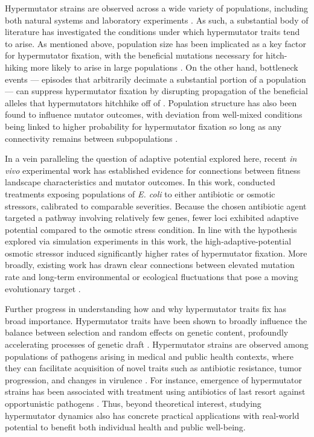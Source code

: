 Hypermutator strains are observed across a wide variety of populations, including both natural systems and laboratory experiments \citep{sniegowski1997evolution,swings2017adaptive,maddamsetti2020divergent,cherry2018methylation}.
As such, a substantial body of literature has investigated the conditions under which hypermutator traits tend to arise.
As mentioned above, population size has been implicated as a key factor for hypermutator fixation, with the beneficial mutations necessary for hitch-hiking more likely to arise in large populations \citep{raynes2018sign}.
On the other hand, bottleneck events --- episodes that arbitrarily decimate a substantial portion of a population --- can suppress hypermutator fixation by disrupting propagation of the beneficial alleles that hypermutators hitchhike off of \citep{raynes2013effect}.
Population structure has also been found to influence mutator outcomes, with deviation from well-mixed conditions being linked to higher probability for hypermutator fixation so long as any connectivity remains between subpopulations \citep{raynes2019migration}.

In a vein paralleling the question of adaptive potential explored here, recent \textit{in vivo} experimental work has established evidence for connections between fitness landscape characteristics and mutator outcomes.
In this work, \citet{callens2023hypermutator} conducted treatments exposing populations of \textit{E. coli} to either antibiotic or osmotic stressors, calibrated to comparable severities.
Because the chosen antibiotic agent targeted a pathway involving relatively few genes, fewer loci exhibited adaptive potential compared to the osmotic stress condition.
In line with the hypothesis explored via simulation experiments in this work, the high-adaptive-potential osmotic stressor induced significantly higher rates of hypermutator fixation.
More broadly, existing work has drawn clear connections between elevated mutation rate and long-term environmental or ecological fluctuations that pose a moving evolutionary target \citep{leigh1970natural,travis2002mutator,rosenbloom2014frequencydependent}.

Further progress in understanding how and why hypermutator traits fix has broad importance.
Hypermutator traits have been shown to broadly influence the balance between selection and random effects on genetic content, profoundly accelerating processes of genetic draft \citep{couce2017mutator}.
Hypermutator strains are observed among populations of pathogens arising in medical and public health contexts, where they can facilitate acquisition of novel traits such as antibiotic resistance, tumor progression, and changes in virulence \citep{eliopoulos2003hypermutation,jolivetgougeon2011bacterial,stern2016viral,schlesner2015hypermutation}.
For instance, emergence of hypermutator strains has been associated with treatment using antibiotics of last resort against opportunistic pathogens \citep{mehta2019essential}.
Thus, beyond theoretical interest, studying hypermutator dynamics also has concrete practical applications with real-world potential to benefit both individual health and public well-being.

